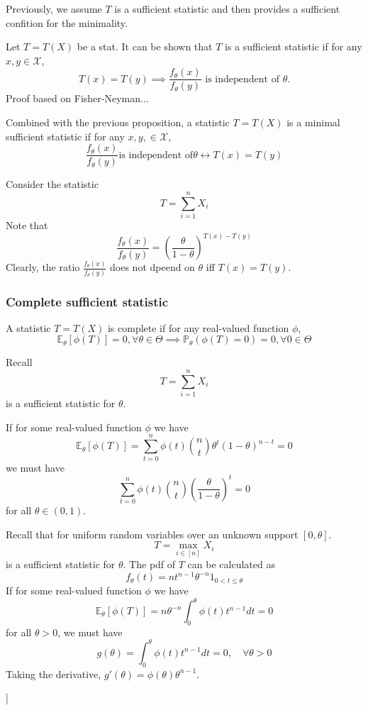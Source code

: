 Previously, we assume $T$ is a sufficient statistic and then provides a sufficient confition for the minimality.

Let $T=T(X)$ be a stat. It can be shown that $T$ is a sufficient statistic if for any $x, y \in \mathcal{X}$,
\[
    T(x)=T(y) \implies \frac{f_\theta(x)}{f_\theta(y)} \text{ is independent of } \theta.
\]
Proof based on Fisher-Neyman...

Combined with the previous proposition, a statistic $T=T(X)$ is a minimal sufficient statistic
if for any $x, y, \in \mathcal{X}$,
\[
    \frac{f_\theta(x)}{f_\theta(y)} \text{is independent of} \theta \leftrightarrow T(x) = T(y)
\]

\begin{exmp}
    Consider the statistic
    \[
        T = \sum_{i=1}^{n} X_i
    \]
    Note that
    \[
        \frac{f_\theta(x)}{f_\theta(y)} = \left(\frac{\theta}{1-\theta}\right)^{T(x)-T(y)}
    \]
    Clearly, the ratio $\frac{f_\theta(x)}{f_\theta(y)}$ does not dpeend on $\theta$ iff $T(x) = T(y)$.
\end{exmp}

\subsubsection{Complete sufficient statistic}

A statistic $T=T(X)$ is complete if for any real-valued function $\phi$,
\[
    \mathbb{E}_\theta [\phi(T)] = 0, \forall \theta \in \Theta \implies \mathbb{P}_\theta(\phi(T)=0) = 0, \forall 0 \in \Theta
\]


\begin{exmp}
    Recall
    \[
        T = \sum_{i=1}^{n} X_i
    \]
    is a sufficient statistic for $\theta$.

    If for some real-valued function $\phi$ we have
    \[
        \mathbb{E}_\theta[\phi(T)] = \sum_{t=0}^{n} \phi(t) {n \choose t} \theta^t (1-\theta)^{n-t} = 0
    \]
    we must have
    \[
        \sum_{t=0}^{n} \phi(t) {n \choose t} \left( \frac{\theta}{1-\theta} \right)^t = 0
    \]
    for all $\theta \in (0, 1)$.

\end{exmp}

\begin{exmp}
    Recall that for uniform random variables over an unknown support $[0, \theta]$.
    \[
        T = \max_{i \in [n]} X_i
    \]
    is a sufficient statistic for $\theta$.
    The pdf of $T$ can be calculated as
    \[
        f_\theta(t) = n t^{n-1} \theta^{-n} 1_{0 < t \leq \theta}
    \]
    If for some real-valued function $\phi$ we have
    \[
        \mathbb{E}_\theta[\phi(T)] = n \theta^{-n} \int_0^\theta \phi(t) t^{n-1} dt = 0
    \]
    for all $\theta > 0$, we must have
    \[
        g(\theta) = \int_0^\theta \phi(t) t^{n-1} dt = 0, \quad \forall \theta > 0
    \]
    Taking the derivative, $g'(\theta)=\phi(\theta)\theta^{n-1}$.

\end{exmp}]

